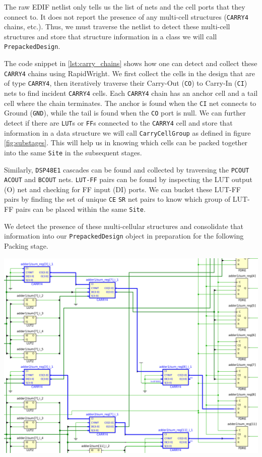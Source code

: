 \begin{multicols}{2}
The raw EDIF netlist only tells us the list of nets and the cell ports that they connect to. 
It does not report the presence of any multi-cell structures (\texttt{CARRY4} chains, etc.). 
Thus, we must traverse the netlist to detect these multi-cell structures and store that structure information in a class we will call \texttt{PrepackedDesign}.

The code snippet in \ref{lst:carry_chains} shows how one can detect and collect these \texttt{CARRY4} chains using RapidWright. 
We first collect the cells in the design that are of type \texttt{CARRY4}, then iteratively traverse their Carry-Out (\texttt{CO}) to Carry-In (\texttt{CI}) nets to find incident \texttt{CARRY4} cells.
Each \texttt{CARRY4} chain has an anchor cell and a tail cell where the chain terminates.
The anchor is found when the \texttt{CI} net connects to Ground (\texttt{GND}), while the tail is found when the \texttt{CO} port is null. 
We can further detect if there are \texttt{LUT}s or \texttt{FF}s connected to the \texttt{CARRY4} cell and store that information in a data structure we will call \texttt{CarryCellGroup} as defined in figure \ref{fig:substages}.
This will help us in knowing which cells can be packed together into the same \texttt{Site} in the subsequent stages. 

Similarly, \texttt{DSP48E1} cascades can be found and collected by traversing the \texttt{PCOUT} \texttt{ACOUT} and \texttt{BCOUT} nets.
\texttt{LUT-FF} pairs can be found by inspecting the LUT output (O) net and checking for FF input (DI) ports. 
We can bucket these LUT-FF pairs by finding the set of unique \texttt{CE} \texttt{SR} net pairs to know which group of LUT-FF pairs can be placed within the same \texttt{Site}. 

We detect the presence of these multi-cellular structures and consolidate that information into our \texttt{PrepackedDesign} object in preparation for the following Packing stage. 


\end{multicols}
{
    \centering
    \includegraphics[width=0.8\columnwidth]{figures/carry_chain_traversal.png}
    \label{fig:carry_chain_traversal}
}
